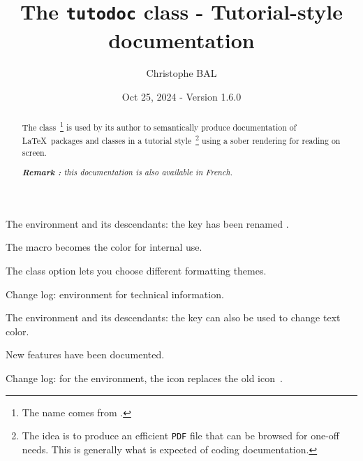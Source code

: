 \title{The \texttt{tutodoc} class - Tutorial-style documentation}
\author{Christophe BAL}
\date{Oct 25, 2024 - Version 1.6.0}

\maketitle

\begin{abstract}
    The \thisproj{} class\,%
    \footnote{
        The name comes from .
    }
    is used by its author to semantically produce documentation of \LaTeX\ packages and classes in a tutorial style\,%
    \footnote{
        The idea is to produce an efficient \texttt{PDF} file that can be browsed for one-off needs. This is generally what is expected of coding documentation.
    }
    using a sober rendering for reading on screen.

    \smallskip

    \noindent
    \emph{\textbf{Remark :} this documentation is also available in French.}
\end{abstract}

\medskip

\begin{center}
\small
\begin{minipage}{.9\textwidth}
\begin{tdocnote}
\small

\begin{tdocbreak}
    \item The  environment and its descendants: the  key has been renamed .

    \item The macro  becomes the color  for internal use.
\end{tdocbreak}


\begin{tdocnew}
    \item The  class option lets you choose different formatting themes.

	\item Change log:  environment for technical information.
	
    \item The  environment and its descendants: the  key can also be used to change text color.

    \item New features have been documented.
\end{tdocnew}


\begin{tdocupdate}
    \item Change log: for the  environment, the icon  replaces the old icon \fbox{\faMagic}\,.
\end{tdocupdate}
\end{tdocnote}
\end{minipage}
\end{center}


